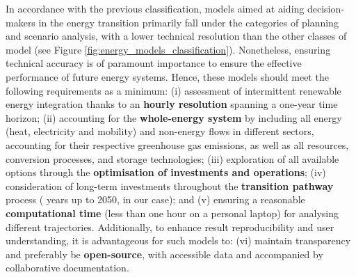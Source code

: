 \newpage
In accordance with the previous classification, models aimed at aiding decision-makers in the energy transition primarily fall under the categories of planning and scenario analysis, with a lower technical resolution than the other classes of model (see Figure \ref{fig:energy_models_classification}). Nonetheless, ensuring technical accuracy is of paramount importance to ensure the effective performance of future energy systems. Hence, these models should meet the following requirements as a minimum:
(i) assessment of intermittent renewable energy integration thanks to an \textbf{hourly resolution} spanning a one-year time horizon;
(ii) accounting for the \textbf{whole-energy system} by including all energy (\ie heat, electricity and mobility) and non-energy flows in different sectors, accounting for their respective greenhouse gas emissions, as well as all resources, conversion processes, and storage technologies;
(iii) exploration of all available options through the \textbf{optimisation of investments and operations};
(iv) consideration of long-term investments throughout the \textbf{transition pathway} process ( years up to 2050, in our case); and
(v) ensuring a reasonable \textbf{computational time} (\ie less than one hour on a personal laptop) for analysing different trajectories.
Additionally, to enhance result reproducibility and user understanding, it is advantageous for such models to:
(vi) maintain transparency and preferably be \textbf{open-source}, with accessible data and accompanied by collaborative documentation.


